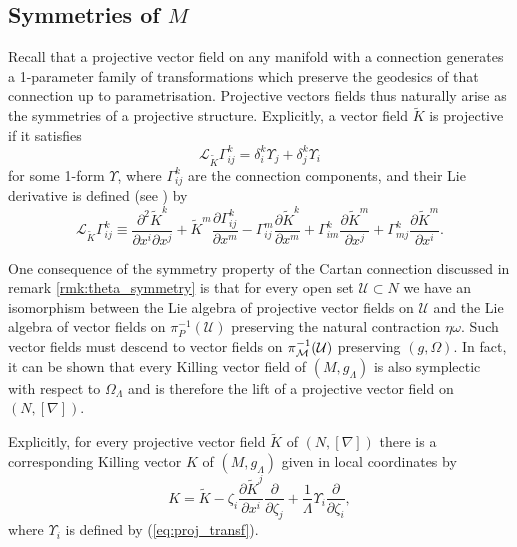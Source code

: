 



\subsection{Symmetries of $M$}

Recall that a projective vector field on any manifold with a connection
generates a 1-parameter family of transformations which preserve the
geodesics of that connection up to parametrisation. Projective vectors
fields thus naturally arise as the symmetries of a projective structure.
Explicitly, a vector field $\tilde{K}$ is projective if it satisfies
\begin{equation}
\mathcal{L}_{\tilde{K}}\Gamma_{ij}^{k}=\delta_{i}^{k}\Upsilon_{j}+\delta_{j}^{k}\Upsilon_{i}\label{eq:proj_transf}
\end{equation}
for some 1-form $\Upsilon$, where $\Gamma_{ij}^{k}$ are the connection
components, and their Lie derivative is defined (see \cite{yano})
by
\begin{equation}
\mathcal{L}_{\tilde{K}}\Gamma_{ij}^{k}\equiv\frac{\partial^{2}\tilde{K}^{k}}{\partial x^{i}\partial x^{j}}+\tilde{K}^{m}\frac{\partial\Gamma_{ij}^{k}}{\partial x^{m}}-\Gamma_{ij}^{m}\frac{\partial \tilde{K}^{k}}{\partial x^{m}}+\Gamma_{im}^{k}\frac{\partial \tilde{K}^{m}}{\partial x^{j}}+\Gamma_{mj}^{k}\frac{\partial \tilde{K}^{m}}{\partial x^{i}}.\label{eq:liederivGamma}
\end{equation}


One consequence of the symmetry property of the Cartan connection discussed in remark \ref{rmk:theta_symmetry} is that for every open set $\mathcal{U}\subset N$ we have an isomorphism between the Lie algebra of projective vector fields on $\mathcal{U}$ and the Lie algebra of vector fields on $\pi_P^{-1}(\mathcal{U})$ preserving the natural contraction $\eta\omega$. Such vector fields must descend to vector fields on $\pi_{\mathcal{M}}^{-1}(\mathcal{U})$ preserving $(g,\Omega)$. In fact, it can be shown that every Killing vector field of $(M,g_\Lambda)$ is also symplectic with respect to $\Omega_\Lambda$ and is therefore the lift of a projective vector field on $(N,[\nabla])$.

Explicitly, for every projective vector field $\tilde{K}$ of $(N,[\nabla])$
there is a corresponding Killing vector $K$ of $(M,g_{\Lambda})$
given in local coordinates by 
\begin{equation}
{K}=\tilde{K}-\zeta_{i}\frac{\partial \tilde{K}^{j}}{\partial x^{i}}\frac{\partial}{\partial \zeta_{j}}+\frac{1}{\Lambda}\Upsilon_{i}\frac{\partial}{\partial \zeta_{i}},\label{eq:kvf_from_pvf}
\end{equation}
where $\Upsilon_{i}$ is defined by (\ref{eq:proj_transf}).

